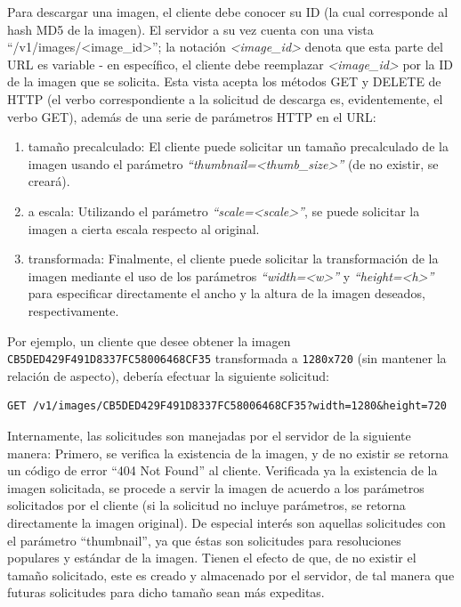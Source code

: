 \documentclass[11pt,letterpaper]{article}
\begin{document}
Para descargar una imagen, el cliente debe conocer su ID (la cual corresponde al hash MD5 de la imagen). El servidor a su vez cuenta con una vista ``/v1/images/\textless image\_id\textgreater''; la notación \emph{\textless image\_id\textgreater} denota que esta parte del URL es variable - en específico, el cliente debe reemplazar \emph{\textless image\_id\textgreater} por la ID de la imagen que se solicita. Esta vista acepta los métodos GET y DELETE de HTTP (el verbo correspondiente a la solicitud de descarga es, evidentemente, el verbo GET), además de una serie de parámetros HTTP en el URL:
\begin{enumerate}
    \item tamaño precalculado: El cliente puede solicitar un tamaño precalculado de la imagen usando el parámetro \emph{``thumbnail=\textless thumb\_size\textgreater''} (de no existir, se creará).
    \item a escala: Utilizando el parámetro \emph{``scale=\textless scale\textgreater''}, se puede solicitar la imagen a cierta escala respecto al original.
    \item transformada: Finalmente, el cliente puede solicitar la transformación de la imagen mediante el uso de los parámetros \emph{``width=\textless w\textgreater''} y \emph{``height=\textless h\textgreater''} para especificar directamente el ancho y la altura de la imagen deseados, respectivamente.
\end{enumerate}

Por ejemplo, un cliente que desee obtener la imagen \texttt{CB5DED429F491D8337FC58006468CF35} transformada a \texttt{1280x720} (sin mantener la relación de aspecto), debería efectuar la siguiente solicitud:
\begin{verbatim}
GET /v1/images/CB5DED429F491D8337FC58006468CF35?width=1280&height=720
\end{verbatim}

Internamente, las solicitudes son manejadas por el servidor de la siguiente manera:
Primero, se verifica la existencia de la imagen, y de no existir se retorna un código de error ``404 Not Found'' al cliente.
Verificada ya la existencia de la imagen solicitada, se procede a servir la imagen de acuerdo a los parámetros solicitados por el cliente (si la solicitud no incluye parámetros, se retorna directamente la imagen original). De especial interés son aquellas solicitudes con el parámetro ``thumbnail'', ya que éstas son solicitudes para resoluciones populares y estándar de la imagen. Tienen el efecto de que, de no existir el tamaño solicitado, este es creado y almacenado por el servidor, de tal manera que futuras solicitudes para dicho tamaño sean más expeditas.\\
\end{document}
